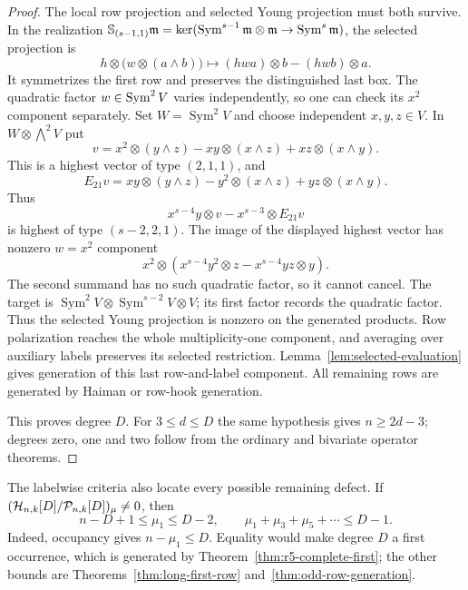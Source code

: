 \begin{proof}
The local row projection and selected Young projection must both
survive. In the realization
$\mathbb S_{(s-1,1)}\mathfrak m
=\ker(\operatorname{Sym}^{s-1}\mathfrak m\otimes\mathfrak m
\to\operatorname{Sym}^s\mathfrak m)$, the selected projection is
\[
 h\otimes\bigl(w\otimes(a\wedge b)\bigr)
             \longmapsto (hwa)\otimes b-(hwb)\otimes a.
\]
It symmetrizes the first row and preserves the distinguished last box.
The quadratic factor $w\in\operatorname{Sym}^2V$ varies independently, so
one can check its $x^2$ component separately.
Set
$W=\operatorname{Sym}^2V$ and choose
independent $x,y,z\in V$. In $W\otimes\bigwedge^2V$ put
\[
 v=x^2\otimes(y\wedge z)-xy\otimes(x\wedge z)
                         +xz\otimes(x\wedge y).
\]
This is a highest vector of type $(2,1,1)$, and
\[
 E_{21}v=xy\otimes(y\wedge z)-y^2\otimes(x\wedge z)
                         +yz\otimes(x\wedge y).
\]
Thus
\[
 x^{s-4}y\otimes v-x^{s-3}\otimes E_{21}v
\]
is highest of type $(s-2,2,1)$.
The image of the displayed highest vector has nonzero $w=x^2$
component
\[
 x^2\otimes
 (x^{s-4}y^2\otimes z-x^{s-4}yz\otimes y).
\]
The second summand has no such quadratic factor, so it cannot cancel.
The target is $\operatorname{Sym}^2V\otimes\operatorname{Sym}^{s-2}V\otimes V$;
its first factor records the quadratic factor.
Thus the selected Young projection is nonzero on the generated
products.  Row polarization reaches the whole multiplicity-one
component, and averaging over auxiliary labels preserves its selected restriction.
Lemma~\ref{lem:selected-evaluation} gives generation of this last
row-and-label component.
All remaining rows are generated by Haiman or row-hook generation.

This proves degree $D$.  For $3\le d\le D$ the same hypothesis
gives $n\ge2d-3$; degrees zero, one and two follow from the
ordinary and bivariate operator theorems.
\end{proof}

The labelwise criteria also locate every possible remaining defect.
If $(\mathcal H_{n,k}[D]/\mathcal P_{n,k}[D])_\mu\ne0$, then
\[
 n-D+1\le\mu_1\le D-2,
 \qquad \mu_1+\mu_3+\mu_5+\cdots\le D-1.
\]
Indeed, occupancy gives $n-\mu_1\le D$. Equality would make degree
$D$ a first occurrence, which is generated by
Theorem~\ref{thm:r5-complete-first}; the other bounds are
Theorems~\ref{thm:long-first-row} and~\ref{thm:odd-row-generation}.

